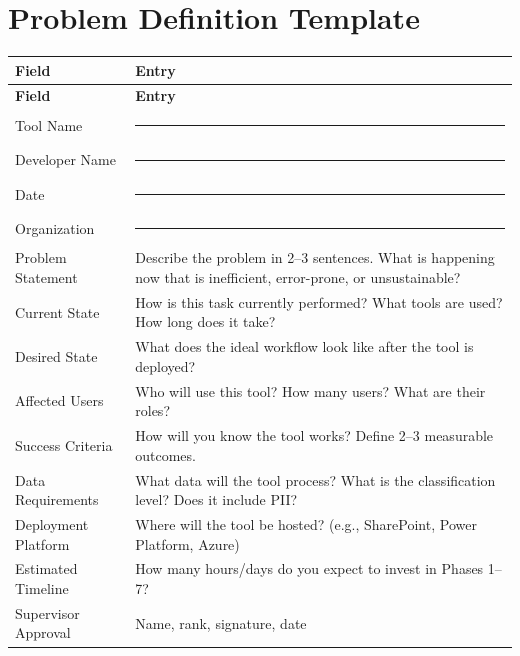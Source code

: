 \documentclass[11pt,letterpaper]{article}
\begin{document}
\newpage
\appendix
\section{Problem Definition Template}
\label{app:problem-definition}

\begin{longtable}{@{}p{4cm}p{9.5cm}@{}}
\toprule
\textbf{Field} & \textbf{Entry} \\
\midrule
\endfirsthead
\toprule
\textbf{Field} & \textbf{Entry} \\
\midrule
\endhead
\bottomrule
\endlastfoot
Tool Name          & \rule{9cm}{0.4pt} \\
\midrule
Developer Name     & \rule{9cm}{0.4pt} \\
\midrule
Date               & \rule{9cm}{0.4pt} \\
\midrule
Organization       & \rule{9cm}{0.4pt} \\
\midrule
Problem Statement  & Describe the problem in 2--3 sentences. What is happening now that is inefficient, error-prone, or unsustainable? \\
\midrule
Current State      & How is this task currently performed? What tools are used? How long does it take? \\
\midrule
Desired State      & What does the ideal workflow look like after the tool is deployed? \\
\midrule
Affected Users     & Who will use this tool? How many users? What are their roles? \\
\midrule
Success Criteria   & How will you know the tool works? Define 2--3 measurable outcomes. \\
\midrule
Data Requirements  & What data will the tool process? What is the classification level? Does it include PII? \\
\midrule
Deployment Platform & Where will the tool be hosted? (e.g., SharePoint, Power Platform, Azure) \\
\midrule
Estimated Timeline & How many hours/days do you expect to invest in Phases 1--7? \\
\midrule
Supervisor Approval & Name, rank, signature, date \\
\end{longtable}

\newpage
\end{document}
